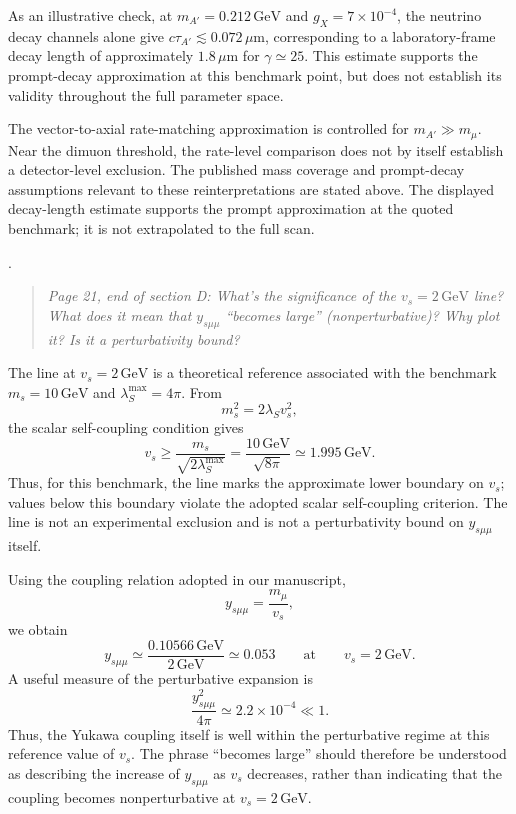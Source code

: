 \documentclass[12pt,a4paper]{article}
\begin{document}
As an illustrative check, at \(m_{A'}=0.212\,\mathrm{GeV}\) and \(g_X=7\times10^{-4}\), the neutrino decay channels alone give \(c\tau_{A'}\lesssim0.072\,\mu\mathrm{m}\), corresponding to a laboratory-frame decay length of approximately \(1.8\,\mu\mathrm{m}\) for \(\gamma\simeq25\). This estimate supports the prompt-decay approximation at this benchmark point, but does not establish its validity throughout the full parameter space.

The vector-to-axial rate-matching approximation is controlled for \(m_{A'}\gg m_\mu\). Near the dimuon threshold, the rate-level comparison does not by itself establish a detector-level exclusion. The published mass coverage and prompt-decay assumptions relevant to these reinterpretations are stated above. The displayed decay-length estimate supports the prompt approximation at the quoted benchmark; it is not extrapolated to the full scan.

\medskip
{}. \begin{quote}\itshape
Page 21, end of section D: What's the significance of the \(v_s=2\,\mathrm{GeV}\) line? What does it mean that \(y_{s\mu\mu}\) ``becomes large'' (nonperturbative)? Why plot it? Is it a perturbativity bound?
\end{quote}

The line at \(v_s=2\,\mathrm{GeV}\) is a theoretical reference associated with the benchmark \(m_s=10\,\mathrm{GeV}\) and \(\lambda_S^{\max}=4\pi\). From
\[
m_s^2=2\lambda_Sv_s^2,
\]
the scalar self-coupling condition gives
\[
v_s\geq\frac{m_s}{\sqrt{2\lambda_S^{\max}}}
=\frac{10\,\mathrm{GeV}}{\sqrt{8\pi}}
\simeq1.995\,\mathrm{GeV}.
\]
Thus, for this benchmark, the line marks the approximate lower boundary on \(v_s\); values below this boundary violate the adopted scalar self-coupling criterion. The line is not an experimental exclusion and is not a perturbativity bound on \(y_{s\mu\mu}\) itself.

Using the coupling relation adopted in our manuscript,
\[
y_{s\mu\mu}=\frac{m_\mu}{v_s},
\]
we obtain
\[
y_{s\mu\mu}\simeq
\frac{0.10566\,\mathrm{GeV}}{2\,\mathrm{GeV}}
\simeq0.053
\qquad\text{at}\qquad v_s=2\,\mathrm{GeV}.
\]
A useful measure of the perturbative expansion is
\[
\frac{y_{s\mu\mu}^2}{4\pi}
\simeq2.2\times10^{-4}\ll1.
\]
Thus, the Yukawa coupling itself is well within the perturbative regime at this reference value of \(v_s\). The phrase ``becomes large'' should therefore be understood as describing the increase of \(y_{s\mu\mu}\) as \(v_s\) decreases, rather than indicating that the coupling becomes nonperturbative at \(v_s=2\,\mathrm{GeV}\).
\end{document}
